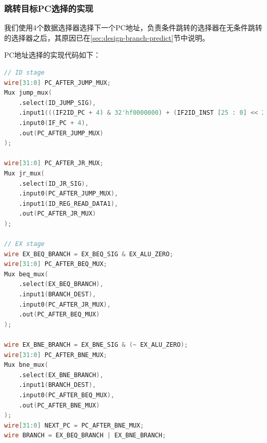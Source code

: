 \documentclass[UTF8]{ctexart}
\begin{document}
\subsubsection{跳转目标PC选择的实现}
我们使用4个数据选择器选择下一个PC地址，负责条件跳转的选择器在无条件跳转的选择器之后，其原因已在\ref{sec:design-branch-predict}节中说明。\par
PC地址选择的实现代码如下：
\begin{lstlisting}[language=verilog]
// ID stage
wire[31:0] PC_AFTER_JUMP_MUX;
Mux jump_mux(
    .select(ID_JUMP_SIG), 
    .input1(((IF2ID_PC + 4) & 32'hf0000000) + (IF2ID_INST [25 : 0] << 2)),
    .input0(IF_PC + 4),
    .out(PC_AFTER_JUMP_MUX)
);

wire[31:0] PC_AFTER_JR_MUX;
Mux jr_mux(
    .select(ID_JR_SIG),   
    .input0(PC_AFTER_JUMP_MUX),
    .input1(ID_REG_READ_DATA1),
    .out(PC_AFTER_JR_MUX)
);

// EX stage
wire EX_BEQ_BRANCH = EX_BEQ_SIG & EX_ALU_ZERO;
wire[31:0] PC_AFTER_BEQ_MUX;
Mux beq_mux(
    .select(EX_BEQ_BRANCH),
    .input1(BRANCH_DEST),
    .input0(PC_AFTER_JR_MUX),
    .out(PC_AFTER_BEQ_MUX)
);

wire EX_BNE_BRANCH = EX_BNE_SIG & (~ EX_ALU_ZERO);
wire[31:0] PC_AFTER_BNE_MUX;
Mux bne_mux(
    .select(EX_BNE_BRANCH),
    .input1(BRANCH_DEST),
    .input0(PC_AFTER_BEQ_MUX),
    .out(PC_AFTER_BNE_MUX)
);
wire[31:0] NEXT_PC = PC_AFTER_BNE_MUX;
wire BRANCH = EX_BEQ_BRANCH | EX_BNE_BRANCH;
\end{lstlisting}
\end{document}
